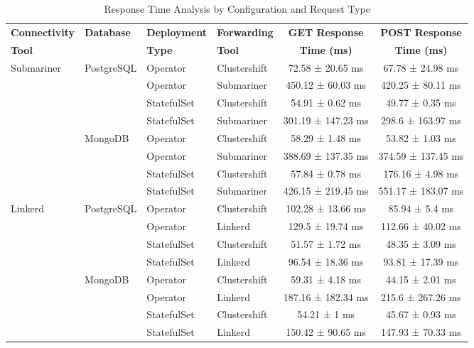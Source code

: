 \begin{table}[tb]
  \caption{Response Time Analysis by Configuration and Request Type}
  \label{tab:response_time_vertical}
  \centering
  \begin{tabular}{@{}llllcc@{}}
    \toprule
    \textbf{Connectivity} & \textbf{Database} & \textbf{Deployment} & \textbf{Forwarding} & \textbf{GET Response} & \textbf{POST Response} \\
    \textbf{Tool} & & \textbf{Type} & \textbf{Tool} & \textbf{Time (ms)} & \textbf{Time (ms)} \\
    \midrule
    \multirow{8}{*}{Submariner} & \multirow{4}{*}{PostgreSQL} & Operator & Clustershift & 72.58 ± 20.65 ms & 67.78 ± 24.98 ms \\
     &  & Operator & Submariner & 450.12 ± 60.03 ms & 420.25 ± 80.11 ms \\
     &  & StatefulSet & Clustershift & 54.91 ± 0.62 ms & 49.77 ± 0.35 ms \\
     &  & StatefulSet & Submariner & 301.19 ± 147.23 ms & 298.6 ± 163.97 ms \\
    \cmidrule(lr){2-6}
     & \multirow{4}{*}{MongoDB} & Operator & Clustershift & 58.29 ± 1.48 ms & 53.82 ± 1.03 ms \\
     &  & Operator & Submariner & 388.69 ± 137.35 ms & 374.59 ± 137.45 ms \\
     &  & StatefulSet & Clustershift & 57.84 ± 0.78 ms & 176.16 ± 4.98 ms \\
     &  & StatefulSet & Submariner & 426.15 ± 219.45 ms & 551.17 ± 183.07 ms \\
    \midrule
    \multirow{8}{*}{Linkerd} & \multirow{4}{*}{PostgreSQL} & Operator & Clustershift & 102.28 ± 13.66 ms & 85.94 ± 5.4 ms \\
     &  & Operator & Linkerd & 129.5 ± 19.74 ms & 112.66 ± 40.02 ms \\
     &  & StatefulSet & Clustershift & 51.57 ± 1.72 ms & 48.35 ± 3.09 ms \\
     &  & StatefulSet & Linkerd & 96.54 ± 18.36 ms & 93.81 ± 17.39 ms \\
    \cmidrule(lr){2-6}
     & \multirow{4}{*}{MongoDB} & Operator & Clustershift & 59.31 ± 4.18 ms & 44.15 ± 2.01 ms \\
     &  & Operator & Linkerd & 187.16 ± 182.34 ms & 215.6 ± 267.26 ms \\
     &  & StatefulSet & Clustershift & 54.21 ± 1 ms & 45.67 ± 0.93 ms \\
     &  & StatefulSet & Linkerd & 150.42 ± 90.65 ms & 147.93 ± 70.33 ms \\

\end{tabular}
\end{table}
